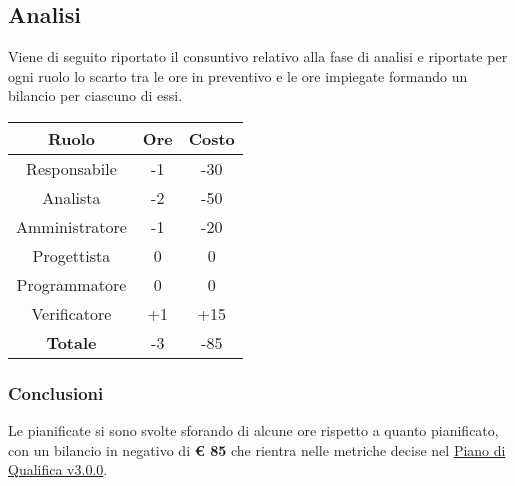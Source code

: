 \documentclass{scalatekids-article}
\begin{document}
\subsection{Analisi}
Viene di seguito riportato il consuntivo relativo alla fase di analisi e riportate per ogni ruolo lo
scarto tra le ore in preventivo e le ore impiegate formando un bilancio per ciascuno di essi.
\begin{center}
  \normalsize
  \begin{tabular}{| c | c | c |}
    \hline
    \textbf{Ruolo} & \textbf{Ore} & \textbf{Costo}\\
    \hline
    Responsabile & -1 & -30 \\
    Analista & -2 & -50\\
    Amministratore & -1 & -20\\
    Progettista & 0 & 0\\
    Programmatore & 0 & 0\\
    Verificatore & +1 & +15\\
    \hline
    \textbf{Totale} & -3 & -85\\
    \hline
  \end{tabular}
\end{center}

\subsubsection{Conclusioni}
Le  pianificate si sono svolte sforando di alcune ore rispetto a quanto pianificato, con un bilancio in negativo di \textbf{\euro{} 85} che rientra nelle metriche decise nel \href{run:PianoDiQualifica\_v3.0.0.pdf}{Piano di Qualifica v3.0.0}.
\end{document}
